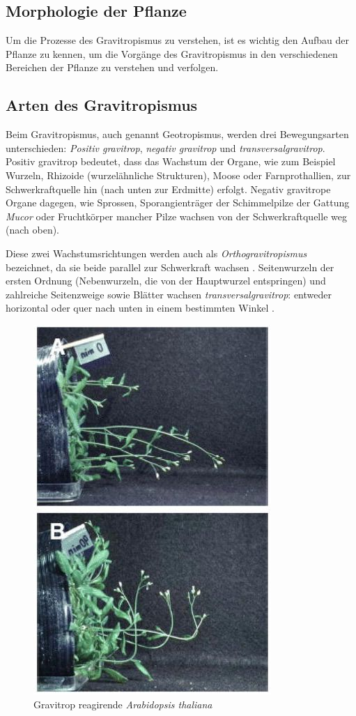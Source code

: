 \documentclass[
a4paper, 
11pt, 
ngerman,
listof=totoc,
bibliography=totocnumbered,
abstracton
]{scrreprt}
\begin{document}
\subsection{Morphologie der Pflanze}

Um die Prozesse des Gravitropismus zu verstehen, ist es wichtig den Aufbau der Pflanze zu kennen, um die Vorgänge des Gravitropismus in den verschiedenen Bereichen der Pflanze zu verstehen und verfolgen.

\subsection{Arten des Gravitropismus}

Beim Gravitropismus, auch genannt Geotropismus, werden drei Bewegungsarten unterschieden: \emph{Positiv gravitrop},  \emph{negativ gravitrop} und  \emph{transversalgravitrop}.
Positiv gravitrop bedeutet, dass das Wachstum der Organe, wie zum Beispiel Wurzeln, Rhizoide (wurzelähnliche Strukturen), Moose oder Farnprothallien, zur Schwerkraftquelle hin (nach unten zur Erdmitte) erfolgt.
Negativ gravitrope Organe dagegen, wie Sprossen, Sporangienträger der Schimmelpilze der Gattung \emph{Mucor} oder Fruchtkörper mancher Pilze wachsen von der Schwerkraftquelle weg (nach oben).

Diese zwei Wachstumsrichtungen werden auch als \emph{Orthogravitropismus} bezeichnet, da sie beide parallel zur Schwerkraft wachsen \parencite[546]{Jacob}.
Seitenwurzeln der ersten Ordnung (Nebenwurzeln, die von der Hauptwurzel entspringen) und zahlreiche Seitenzweige sowie Blätter wachsen \emph{ transversalgravitrop}: entweder horizontal oder quer nach unten in einem bestimmten Winkel \parencite[449]{Strasburger}. 

\begin{figure}[H]
\centering 
 \includegraphics[width = 0.3\linewidth]{bilder/gravitrop_reagierende_Pflanze.jpg}
 \caption{Gravitrop reagirende \emph{Arabidopsis thaliana} \label{gravitrop_reagierende_Pflanze}}
\end{figure} 
 
\end{document}
